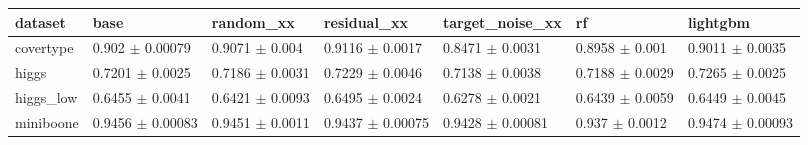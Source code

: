\begin{tabular}{lllllll}
\toprule
dataset & base & random\_xx & residual\_xx & target\_noise\_xx & rf & lightgbm \\
\midrule
covertype & 0.902 $\pm$ 0.00079 & 0.9071 $\pm$ 0.004 & 0.9116 $\pm$ 0.0017 & 0.8471 $\pm$ 0.0031 & 0.8958 $\pm$ 0.001 & 0.9011 $\pm$ 0.0035 \\
higgs & 0.7201 $\pm$ 0.0025 & 0.7186 $\pm$ 0.0031 & 0.7229 $\pm$ 0.0046 & 0.7138 $\pm$ 0.0038 & 0.7188 $\pm$ 0.0029 & 0.7265 $\pm$ 0.0025 \\
higgs\_low & 0.6455 $\pm$ 0.0041 & 0.6421 $\pm$ 0.0093 & 0.6495 $\pm$ 0.0024 & 0.6278 $\pm$ 0.0021 & 0.6439 $\pm$ 0.0059 & 0.6449 $\pm$ 0.0045 \\
miniboone & 0.9456 $\pm$ 0.00083 & 0.9451 $\pm$ 0.0011 & 0.9437 $\pm$ 0.00075 & 0.9428 $\pm$ 0.00081 & 0.937 $\pm$ 0.0012 & 0.9474 $\pm$ 0.00093 \\
\bottomrule
\end{tabular}
